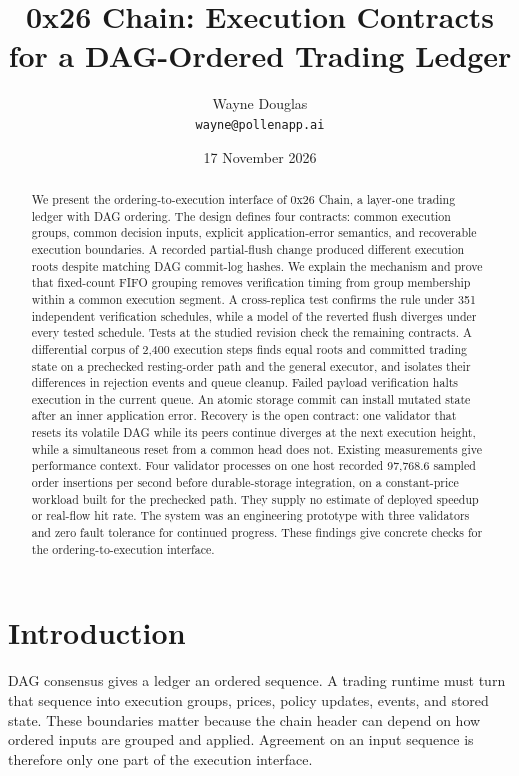 \documentclass[11pt]{article}
\title{0x26 Chain: Execution Contracts for a DAG-Ordered Trading Ledger}
\author{Wayne Douglas\\\small\texttt{wayne@pollenapp.ai}}
\date{17 November 2026}
\begin{document}
\maketitle
\begin{abstract}
We present the ordering-to-execution interface of 0x26 Chain, a layer-one trading ledger with DAG ordering. The design defines four contracts: common execution groups, common decision inputs, explicit application-error semantics, and recoverable execution boundaries. A recorded partial-flush change produced different execution roots despite matching DAG commit-log hashes. We explain the mechanism and prove that fixed-count FIFO grouping removes verification timing from group membership within a common execution segment. A cross-replica test confirms the rule under 351 independent verification schedules, while a model of the reverted flush diverges under every tested schedule.  Tests at the studied revision check the remaining contracts. A differential corpus of 2,400 execution steps finds equal roots and committed trading state on a prechecked resting-order path and the general executor, and isolates their differences in rejection events and queue cleanup. Failed payload verification halts execution in the current queue. An atomic storage commit can install mutated state after an inner application error. Recovery is the open contract: one validator that resets its volatile DAG while its peers continue diverges at the next execution height, while a simultaneous reset from a common head does not.  Existing measurements give performance context. Four validator processes on one host recorded 97,768.6 sampled order insertions per second before durable-storage integration, on a constant-price workload built for the prechecked path. They supply no estimate of deployed speedup or real-flow hit rate. The system was an engineering prototype with three validators and zero fault tolerance for continued progress. These findings give concrete checks for the ordering-to-execution interface.
\end{abstract}
\section{Introduction}
DAG consensus gives a ledger an ordered sequence. A trading runtime must turn that sequence into execution groups, prices, policy updates, events, and stored state. These boundaries matter because the chain header can depend on how ordered inputs are grouped and applied. Agreement on an input sequence is therefore only one part of the execution interface.
\end{document}
